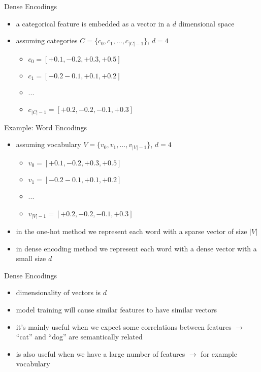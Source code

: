 \begin{frame}{Dense Encodings}
    \begin{itemize}
        \item<1-> a categorical feature is embedded as a vector in a $d$ dimensional space
        \item<2-> assuming categories $C = \{ c_0,c_1,..., c_{|C|-1} \}$, $d=4$
        \begin{itemize}
            \item<3-> $c_0 = [+0.1,-0.2,+0.3,+0.5]$
            \item<4-> $c_1 = [-0.2-0.1,+0.1,+0.2]$
            \item<4-> ...
            \item<4-> $c_{|C|-1} = [+0.2,-0.2,-0.1,+0.3]$
        \end{itemize}
    \end{itemize}
\end{frame}
\begin{frame}{Example: Word Encodings}
    \begin{itemize}
        \item<1-> assuming vocabulary $V = \{ v_0,v_1,..., v_{|V|-1} \}$, $d=4$
        \begin{itemize}
            \item<2-> $v_0 = [+0.1,-0.2,+0.3,+0.5]$
            \item<2-> $v_1 = [-0.2-0.1,+0.1,+0.2]$
            \item<2-> ...
            \item<2-> $v_{|V|-1} = [+0.2,-0.2,-0.1,+0.3]$
        \end{itemize}
        \item<3-> in the one-hot method we represent each word with a sparse vector of size $|V|$
        \item<4-> in dense encoding method we represent each word with a dense vector with a small size $d$
    \end{itemize}
\end{frame}
\begin{frame}{Dense Encodings}
    \begin{itemize}
        \item<1-> dimensionality of vectors is $d$
        \item<2-> model training will cause similar features to have similar vectors
        \item<3-> it's mainly useful when we expect some correlations between features $\rightarrow$ ``cat'' and ``dog'' are semantically related
        \item<4-> is also useful when we have a large number of features $\rightarrow$ for example vocabulary
    \end{itemize}
\end{frame}